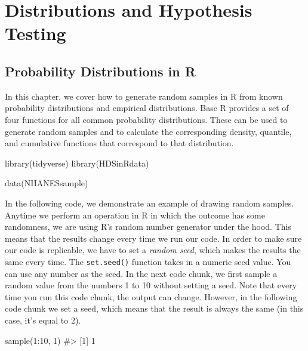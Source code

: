 \documentclass[
  letterpaper,
]{latex/krantz}
\makeatletter
\newenvironment{Shaded}{\begin{snugshade}}{\end{snugshade}}
\newcommand{\CommentTok}[1]{\textcolor[rgb]{0.37,0.37,0.37}{#1}}
\newcommand{\DecValTok}[1]{\textcolor[rgb]{0.68,0.00,0.00}{#1}}
\newcommand{\FunctionTok}[1]{\textcolor[rgb]{0.28,0.35,0.67}{#1}}
\newcommand{\NormalTok}[1]{\textcolor[rgb]{0.00,0.23,0.31}{#1}}
\newcommand{\SpecialCharTok}[1]{\textcolor[rgb]{0.37,0.37,0.37}{#1}}
\newenvironment{kframe}{%
\medskip{}
\setlength{\fboxsep}{.8em}
 \def\at@end@of@kframe{}%
 \ifinner\ifhmode%
  \def\at@end@of@kframe{\end{minipage}}%
  \begin{minipage}{\columnwidth}%
 \fi\fi%
 \def\FrameCommand##1{\hskip\@totalleftmargin \hskip-\fboxsep
 \colorbox{shadecolor}{##1}\hskip-\fboxsep
     \hskip-\linewidth \hskip-\@totalleftmargin \hskip\columnwidth}%
 \MakeFramed {\advance\hsize-\width
   \@totalleftmargin\z@ \linewidth\hsize
   \@setminipage}}%
 {\par\unskip\endMakeFramed%
 \at@end@of@kframe}
\renewenvironment{Shaded}{\begin{kframe}}{\end{kframe}}
\makeatother
\begin{document}
\part{Distributions and Hypothesis Testing}

\chapter{Probability Distributions in
R}\label{sec-probability-distributions}

In this chapter, we cover how to generate random samples in R from known
probability distributions and empirical distributions. Base R provides a
set of four functions for all common probability distributions. These
can be used to generate random samples and to calculate the
corresponding density, quantile, and cumulative functions that
correspond to that distribution.

\begin{Shaded}
\begin{Highlighting}[]
\FunctionTok{library}\NormalTok{(tidyverse)}
\FunctionTok{library}\NormalTok{(HDSinRdata)}

\FunctionTok{data}\NormalTok{(NHANESsample)}
\end{Highlighting}
\end{Shaded}

In the following code, we demonstrate an example of drawing random
samples. Anytime we perform an operation in R in which the outcome has
some randomness, we are using R's random number generator under the
hood. This means that the results change every time we run our code. In
order to make sure our code is replicable, we have to set a \emph{random
seed}, which makes the results the same every time.
The
\texttt{set.seed()}
function takes in a numeric seed value. You can use any number as the
seed. In the next code chunk, we first sample a random value from the
numbers 1 to 10 without setting a seed. Note that every time you run
this code chunk, the output can change. However, in the following code
chunk we set a seed, which means that the result is always the same (in
this case, it's equal to 2).

\begin{Shaded}
\begin{Highlighting}[]
\FunctionTok{sample}\NormalTok{(}\DecValTok{1}\SpecialCharTok{:}\DecValTok{10}\NormalTok{, }\DecValTok{1}\NormalTok{)}
\CommentTok{\#\textgreater{} [1] 1}
\end{Highlighting}
\end{Shaded}
\end{document}

